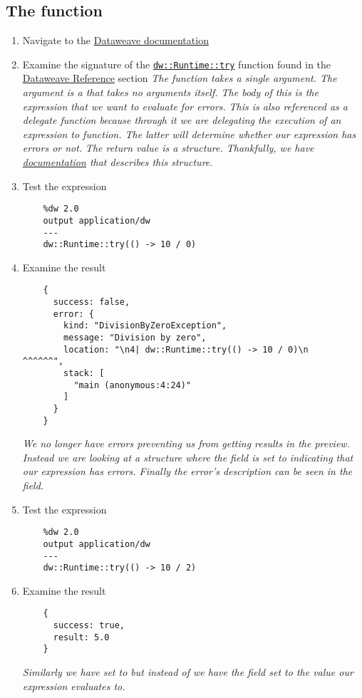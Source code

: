 \subsection{The  function}
\begin{enumerate}[resume*]
\item Navigate to the \href{https://docs.mulesoft.com/mule-runtime/4.3/dataweave}{Dataweave documentation}
\item Examine the signature of the \href{https://docs.mulesoft.com/mule-runtime/4.3/dw-runtime-functions-try}{\lstinline{dw::Runtime::try}} function found in the \href{https://docs.mulesoft.com/mule-runtime/4.3/dw-functions}{Dataweave Reference} section
  \newline
  \emph{
    The  function takes a single argument.  The argument is a \les{} that takes no arguments itself.  The body of this \les{} is the expression that we want to evaluate for errors.
  }
  \newline
  \emph{
    This \les{} is also referenced as a delegate function because through it we are delegating the execution of an expression to  function.  The latter will determine whether our expression has errors or not.
  }
  \newline
  \emph{
    The return value is a  structure.  Thankfully, we have \href{https://docs.mulesoft.com/mule-runtime/4.3/dw-runtime-types}{documentation} that describes this structure.
  }
\item Test the  expression
  \begin{lstlisting}
    %dw 2.0
    output application/dw
    ---
    dw::Runtime::try(() -> 10 / 0)
  \end{lstlisting}
\item Examine the result
  \begin{lstlisting}
    {
      success: false,
      error: {
        kind: "DivisionByZeroException",
        message: "Division by zero",
        location: "\n4| dw::Runtime::try(() -> 10 / 0)\n                          ^^^^^^",
        stack: [
          "main (anonymous:4:24)"
        ]
      }
    }
  \end{lstlisting}
  \emph{
    We no longer have errors preventing us from getting results in the preview.  Instead we are looking at a  structure where the  field is set to  indicating that our expression has errors.  Finally the error's description can be seen in the  field.
  }
\item Test the  expression
  \begin{lstlisting}
    %dw 2.0
    output application/dw
    ---
    dw::Runtime::try(() -> 10 / 2)
  \end{lstlisting}
\item Examine the result
  \begin{lstlisting}
    {
      success: true,
      result: 5.0
    }
  \end{lstlisting}
  \emph{
    Similarly we have  set to  but instead of  we have the  field set to the value our expression evaluates to.
  }


\end{enumerate}
